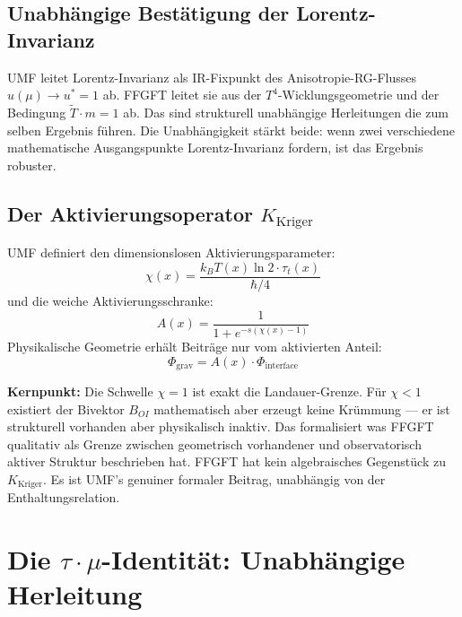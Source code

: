\subsection{Unabhängige Bestätigung der Lorentz-Invarianz}

UMF leitet Lorentz-Invarianz als IR-Fixpunkt des Anisotropie-RG-Flusses
$u(\mu) \to u^* = 1$ ab. FFGFT leitet sie aus der $T^4$-Wicklungsgeometrie
und der Bedingung $\tilde{T}\cdot m = 1$ ab. Das sind strukturell unabhängige
Herleitungen die zum selben Ergebnis führen. Die Unabhängigkeit stärkt beide:
wenn zwei verschiedene mathematische Ausgangspunkte Lorentz-Invarianz fordern,
ist das Ergebnis robuster.

\subsection{Der Aktivierungsoperator \texorpdfstring{$K_\text{Kriger}$}{K\_Kriger}}
\label{sec:kriger}

UMF definiert den dimensionslosen Aktivierungsparameter:
\begin{equation}
  \chi(x) = \frac{k_B T(x)\ln 2 \cdot \tau_t(x)}{\hbar/4}
  \tag{244.6a}
\end{equation}
und die weiche Aktivierungsschranke:
\begin{equation}
  A(x) = \frac{1}{1+e^{-s(\chi(x)-1)}}
  \tag{244.6b}
\end{equation}
Physikalische Geometrie erhält Beiträge nur vom aktivierten Anteil:
\begin{equation}
  \Phi_\text{grav} = A(x) \cdot \Phi_\text{interface}
  \tag{244.6c}
\end{equation}

\textbf{Kernpunkt:} Die Schwelle $\chi = 1$ ist exakt die Landauer-Grenze.
Für $\chi < 1$ existiert der Bivektor $B_{OI}$ mathematisch aber erzeugt keine
Krümmung — er ist strukturell vorhanden aber physikalisch inaktiv. Das
formalisiert was FFGFT qualitativ als Grenze zwischen geometrisch vorhandener
und observatorisch aktiver Struktur beschrieben hat. FFGFT hat kein algebraisches
Gegenstück zu $K_\text{Kriger}$. Es ist UMF's genuiner formaler Beitrag,
unabhängig von der Enthaltungsrelation.

\section{\texorpdfstring{Die $\tau\cdot\mu$-Identität}{Die tau.mu-Identität}: Unabhängige Herleitung}

